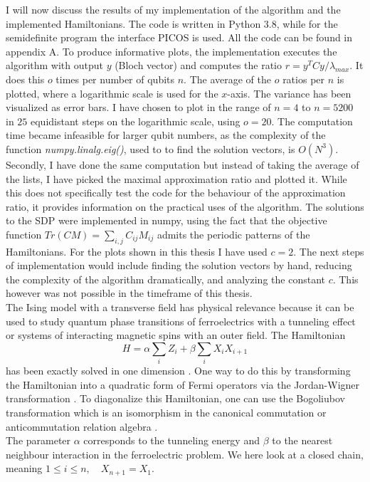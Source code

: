 I will now discuss the results of my implementation of the algorithm and the implemented Hamiltonians.
The code is written in Python 3.8, while for the semidefinite program the interface PICOS is used.
All the code can be found in appendix A.
To produce informative plots, the implementation executes the algorithm with output $y$ (Bloch vector) and computes the ratio $r=y^{T}Cy/\lambda_{max}$.
It does this $o$ times per number of qubits $n$.
The average of the $o$ ratios per $n$ is plotted, where a logarithmic scale is used for the $x$-axis.
The variance has been visualized as error bars.
I have chosen to plot in the range of $n=4$ to $n=5200$ in $25$ equidistant steps on the logarithmic scale, using $o=20$.
The computation time became infeasible for larger qubit numbers, as the complexity of the function \emph{numpy.linalg.eig()}, used to to find the solution vectors, is $O\left(N^3\right) $.
Secondly, I have done the same computation but instead of taking the average of the lists, I have picked the maximal approximation ratio and plotted it.
While this does not specifically test the code for the behaviour of the approximation ratio, it provides information on the practical uses of the algorithm.
The solutions to the SDP were implemented in numpy, using the fact that the objective function $Tr(CM)=\sum_{i,j}C_{ij}M_{ij}$ admits the periodic patterns of the Hamiltonians.
For the plots shown in this thesis I have used $c=2$.
The next steps of implementation would include finding the solution vectors by hand, reducing the complexity of the algorithm dramatically, and analyzing the constant $c$.
This however was not possible in the timeframe of this thesis.\\
The Ising model with a transverse field has physical relevance because it can be used to study quantum phase transitions of ferroelectrics with a tunneling effect or systems of interacting magnetic spins with an outer field.
The Hamiltonian
\[
H=\alpha \sum_{i} Z_i + \beta \sum_{i} X_iX_{i+1}
\]
has been exactly solved in one dimension \cite{pfeuty70}.
One way to do this by transforming the Hamiltonian into a quadratic form of Fermi operators via the Jordan-Wigner transformation \cite{nielsen05}.
To diagonalize this Hamiltonian, one can use the Bogoliubov transformation which is an isomorphism in the canonical commutation or anticommutation relation algebra \cite{bogoljubov58}.\\
The parameter $\alpha$ corresponds to the tunneling energy and $\beta$ to the nearest neighbour interaction in the ferroelectric problem.
We here look at a closed chain, meaning $1\le i \le n, \quad X_{n+1}=X_{1}$.
